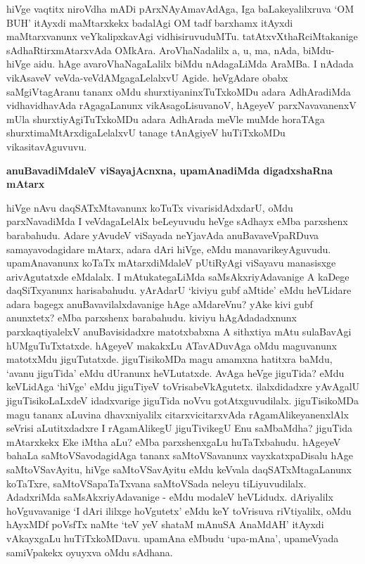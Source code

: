 hiVge vaqtitx niroVdha mADi pArxNAyAmavAdAga, Iga baLakeyalilxruva `OM BUH' itAyxdi maMtarxkekx badalAgi OM tadf barxhamx itAyxdi maMtarxvanunx veYkalipxkavAgi vidhisiruvuduMTu. tatAtxvXthaRciMtakanige sAdhaRtirxmAtarxvAda OMkAra. AroVhaNadalilx a, u, ma, nAda, biMdu- hiVge aidu. hAge avaroVhaNagaLalilx biMdu nAdagaLiMda AraMBa. I nAdada vikAsaveV veVda-veVdAMgagaLelalxvU Agide. heVgAdare obabx saMgiVtagAranu tananx oMdu shurxtiyaninxTuTxkoMDu adara AdhAradiMda vidhavidhavAda rAgagaLanunx vikAsagoLisuvanoV, hAgeyeV parxNavavanenxV mUla shurxtiyAgiTuTxkoMDu adara AdhArada meVle muMde horaTAga shurxtimaMtArxdigaLelalxvU tanage tAnAgiyeV huTiTxkoMDu vikasitavAguvuvu.

{\bigskip
\noindent
{\large\bf anuBavadiMdaleV viSayajAcnxna, upamAnadiMda digadxshaRna mAtarx}}\label{page166}
\medskip

\noindent
hiVge nAvu daqSATxMtavanunx koTuTx vivarisidAdxdarU, oMdu parxNavadiMda I veVdagaLelAlx beLeyuvudu heVge sAdhayx eMba parxshenx barabahudu. Adare yAvudeV viSayada neYjavAda anuBavaveVpaRDuva samayavodagidare mAtarx, adara dAri hiVge, eMdu manavarikeyAguvudu. upamAnavanunx koTaTx mAtarxdiMdaleV pUtiRyAgi viSayavu manasisxge arivAgutatxde eMdalalx. I mAtukategaLiMda saMsAkxriyAdavanige A kaDege daqSiTxyanunx harisabahudu. yArAdarU `kiviyu gubf aMtide' eMdu heVLidare adara bagegx anuBavavilalxdavanige hAge aMdareVnu? yAke kivi gubf anunxtetx? eMba parxshenx barabahudu. kiviyu hAgAdadadxnunx parxkaqtiyalelxV anuBavisidadxre matotxbabxna A sithxtiya mAtu sulaBavAgi hUMguTuTxtatxde. hAgeyeV makakxLu ATavADuvAga oMdu maguvanunx matotxMdu jiguTutatxde. jiguTisikoMDa magu amamxna hatitxra baMdu, `avanu jiguTida' eMdu dUranunx heVLutatxde. AvAga heVge jiguTida? eMdu keVLidAga `hiVge' eMdu jiguTiyeV toVrisabeVkAgutetx. ilalxdidadxre yAvAgalU jiguTisikoLaLxdeV idadxvarige jiguTida noVvu gotAtxguvudilalx. jiguTisikoMDa magu tananx aLuvina dhavxniyalilx citarxvicitarxvAda rAgamAlikeyanenxlAlx seVrisi aLutitxdadxre I rAgamAlikegU jiguTivikegU Enu saMbaMdha? jiguTida mAtarxkekx Eke iMtha aLu? eMba parxshenxgaLu huTaTxbahudu. hAgeyeV bahaLa saMtoVSavodagidAga tananx saMtoVSavanunx vayxkatxpaDisalu hAge saMtoVSavAyitu, hiVge saMtoVSavAyitu eMdu keVvala daqSATxMtagaLanunx koTaTxre, saMtoVSapaTaTxvana saMtoVSada neleyu tiLiyuvudilalx. AdadxriMda saMsAkxriyAdavanige - eMdu modaleV heVLidudx. dAriyalilx hoVguvavanige `I dAri ililxge hoVgutetx' eMdu keY toVrisuva riVtiyalilx, oMdu hAyxMDf poVsfTx naMte `teV yeV shataM mAnuSA AnaMdAH'\label{166} itAyxdi vAkayxgaLu huTiTxkoMDavu. upamAna eMbudu `upa-mAna', upameVyada samiVpakekx oyuyxva oMdu sAdhana.

